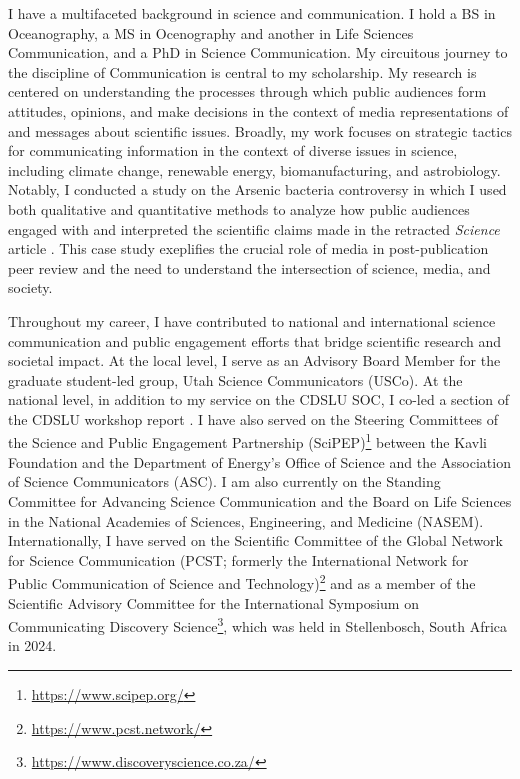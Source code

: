 \documentclass[12pt]{letter}
\begin{document}
I have a multifaceted background in science and communication. I hold a BS in Oceanography, a MS in Ocenography and another in Life Sciences Communication, and a PhD in Science Communication. My circuitous journey to the discipline of Communication is central to my scholarship. My research is centered on understanding the processes through which public audiences form attitudes, opinions, and make decisions in the context of media representations of and messages about scientific issues. Broadly, my work focuses on strategic tactics for communicating information in the context of diverse issues in science, including climate change, renewable energy, biomanufacturing, and astrobiology. Notably, I conducted a study on the Arsenic bacteria controversy \parencite{yeoCaseArseniclifeBlogs2017} in which I used both qualitative and quantitative methods to analyze how public audiences engaged with and interpreted the scientific claims made in the retracted \textit{Science} article \parencite{wolfe-simonBacteriumThatCan2011}. This case study exeplifies the crucial role of media in post-publication peer review and the need to understand the intersection of science, media, and society.

Throughout my career, I have contributed to national and international science communication and public engagement efforts that bridge scientific research and societal impact. At the local level, I serve as an Advisory Board Member for the graduate student-led group, Utah Science Communicators (USCo). At the national level, in addition to my service on the CDSLU SOC, I co-led a section of the CDSLU workshop report \parencite{bimmWorkshopReportCommunicatingforthcoming}. I have also served on the Steering Committees of the Science and Public Engagement Partnership (SciPEP)\footnote{\href{https://www.scipep.org/}{https://www.scipep.org/}} between the Kavli Foundation and the Department of Energy's Office of Science and the Association of Science Communicators (ASC). I am also currently on the Standing Committee for Advancing Science Communication and the Board on Life Sciences in the National Academies of Sciences, Engineering, and Medicine (NASEM). Internationally, I have served on the Scientific Committee of the Global Network for Science Communication (PCST; formerly the International Network for Public Communication of Science and Technology)\footnote{\href{https://www.pcst.network/}{https://www.pcst.network/}} and as a member of the Scientific Advisory Committee for the International Symposium on Communicating Discovery Science\footnote{\href{https://www.discoveryscience.co.za/}{https://www.discoveryscience.co.za/}}, which was held in Stellenbosch, South Africa in 2024.
\end{document}
